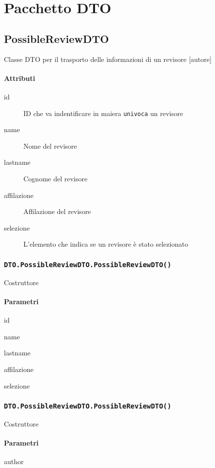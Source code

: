 \section{Pacchetto DTO}
\label{sec:package_dto}

\subsection{PossibleReviewDTO}
Classe DTO per il trasporto delle informazioni di un revisore [autore]
\paragraph{Attributi}
\begin{description}
\item [id] ID che va indentificare in maiera \texttt{univoca} un revisore
\item [name] Nome del revisore
\item [lastname] Cognome del revisore 
\item [affilazione] Affilazione del revisore
\item [selezione] L'elemento che indica se un revisore è stato selezionato
\end{description}
\subsubsection{\texttt{DTO.PossibleReviewDTO.PossibleReviewDTO()}}
Costruttore
\paragraph{Parametri}
\begin{description}
\item id
\item name
\item lastname
\item affilazione
\item selezione
\end{description}
\subsubsection{\texttt{DTO.PossibleReviewDTO.PossibleReviewDTO()}}
Costruttore
\paragraph{Parametri}
\begin{description}
\item author
\end{description}
